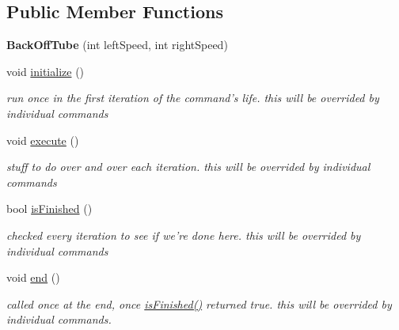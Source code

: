 \subsection*{Public Member Functions}
\begin{DoxyCompactItemize}
\item 
\hypertarget{classBackOffTube_a6fedeb5bfc92b531a300ce2d95a1a3bb}{{\bfseries Back\-Off\-Tube} (int left\-Speed, int right\-Speed)}\label{classBackOffTube_a6fedeb5bfc92b531a300ce2d95a1a3bb}

\item 
\hypertarget{classBackOffTube_a16b83364009db3cb58ec6c09458a8741}{void \hyperlink{classBackOffTube_a16b83364009db3cb58ec6c09458a8741}{initialize} ()}\label{classBackOffTube_a16b83364009db3cb58ec6c09458a8741}

\begin{DoxyCompactList}\small\item\em run once in the first iteration of the command's life. this will be overrided by individual commands \end{DoxyCompactList}\item 
\hypertarget{classBackOffTube_a9d40125cdd95f7ca2db13a5d48e91a93}{void \hyperlink{classBackOffTube_a9d40125cdd95f7ca2db13a5d48e91a93}{execute} ()}\label{classBackOffTube_a9d40125cdd95f7ca2db13a5d48e91a93}

\begin{DoxyCompactList}\small\item\em stuff to do over and over each iteration. this will be overrided by individual commands \end{DoxyCompactList}\item 
bool \hyperlink{classBackOffTube_abda2334a9432829830a51195a9cce4e6}{is\-Finished} ()
\begin{DoxyCompactList}\small\item\em checked every iteration to see if we're done here. this will be overrided by individual commands \end{DoxyCompactList}\item 
\hypertarget{classBackOffTube_a6753fa3b5148d3b8cc06b8e2f7f02be7}{void \hyperlink{classBackOffTube_a6753fa3b5148d3b8cc06b8e2f7f02be7}{end} ()}\label{classBackOffTube_a6753fa3b5148d3b8cc06b8e2f7f02be7}

\begin{DoxyCompactList}\small\item\em called once at the end, once \hyperlink{classBackOffTube_abda2334a9432829830a51195a9cce4e6}{is\-Finished()} returned true. this will be overrided by individual commands. \end{DoxyCompactList}\end{DoxyCompactItemize}
